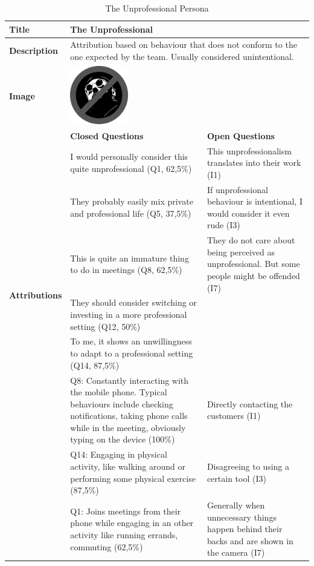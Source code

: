 \begin{longtable}[ht]{ p{}  p{} p{} }
\caption{The Unprofessional Persona}
\label{tab:theUnprofessional}\\
\hline
\textbf{Title} & The Unprofessional \\
    \hline
   \textbf{Description } & \multicolumn{2}{p{.80\textwidth}}{Attribution based on behaviour that does not conform to the one expected by the team. Usually considered unintentional.}  \\
   \hline
   \textbf{Image} &  \includegraphics[valign=t, width=1in, margin=0pt 3pt 0pt 3pt]{figures/TheUnprofessional.png} \\
    \hline
    & \textbf{Closed Questions} & \textbf{Open Questions} \\
    \hline
    \multirow{6}{3cm}{\textbf{Attributions}}  & I would personally consider this quite unprofessional (Q1, 62,5\%) & This unprofessionalism translates into their work (I1) \\
     & They probably easily mix private and professional life (Q5, 37,5\%) &  If unprofessional behaviour is intentional, I would consider it even rude (I3) \\
     & This is quite an immature thing to do in meetings (Q8, 62,5\%) & They do not care about being perceived as unprofessional. But some people might be offended (I7) \\
 	 & They should consider switching or investing in a more professional setting (Q12, 50\%) \\
 	 & To me, it shows an unwillingness to adapt to a professional setting (Q14, 87,5\%) \\
    \hline
    \multirow{5}{3cm}{\textbf{Behaviours}}  & Q8: Constantly interacting with the mobile phone. Typical behaviours include checking notifications, taking phone calls while in the meeting, obviously typing on the device (100\%) &  Directly contacting the customers (I1) \\
     &  Q14: Engaging in physical activity, like walking around or performing some physical exercise (87,5\%) & Disagreeing to using a certain tool (I3) \\
     & Q1: Joins meetings from their phone while engaging in an other activity like running errands, commuting (62,5\%) & Generally when unnecessary things happen behind their backs and are shown in the camera (I7) \\

\end{longtable}
